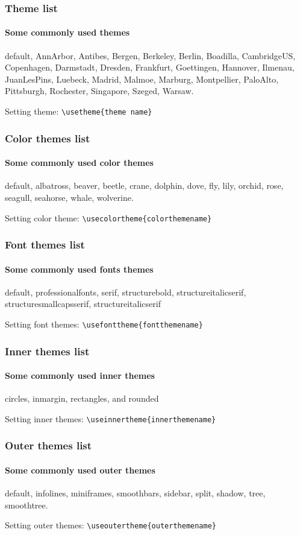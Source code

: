 \documentclass{beamer}
\begin{document}
\begin{frame}[fragile]
    \frametitle{Theme list}
    \framesubtitle{Some commonly used themes}

    default, AnnArbor, Antibes, Bergen, Berkeley, Berlin, Boadilla,
    CambridgeUS, Copenhagen, Darmstadt, Dresden, Frankfurt, Goettingen,
    Hannover, Ilmenau, JuanLesPins, Luebeck, Madrid, Malmoe, Marburg,
    Montpellier, PaloAlto, Pittsburgh, Rochester, Singapore, Szeged, Warsaw.

    \vfill

    Setting theme: \verb`\usetheme{theme name}`
\end{frame}
\begin{frame}[fragile]
    \frametitle{Color themes list}
    \framesubtitle{Some commonly used color themes}

    default, albatross, beaver, beetle, crane, dolphin, dove, fly, lily,
    orchid, rose, seagull, seahorse, whale, wolverine.

    \vfill

    Setting color theme: \verb`\usecolortheme{colorthemename}`
\end{frame}
\begin{frame}[fragile]
    \frametitle{Font themes list}
    \framesubtitle{Some commonly used fonts themes}

    default, professionalfonts, serif, structurebold, structureitalicserif,
    structuresmallcapsserif, structureitalicserif

    \vfill

    Setting font themes: \verb`\usefonttheme{fontthemename}`
\end{frame}
\begin{frame}[fragile]
    \frametitle{Inner themes list}
    \framesubtitle{Some commonly used inner themes}

    circles, inmargin, rectangles, and rounded

    \vfill

    Setting inner themes: \verb`\useinnertheme{innerthemename}`
\end{frame}
\begin{frame}[fragile]
    \frametitle{Outer themes list}
    \framesubtitle{Some commonly used outer themes}

    default, infolines, miniframes, smoothbars, sidebar, split, shadow, tree,
    smoothtree.

    \vfill

    Setting outer themes: \verb`\useoutertheme{outerthemename}`
\end{frame}
\end{document}
